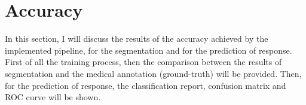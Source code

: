 \documentclass{standalone}
\begin{document}
\section{Accuracy}
In this section, I will discuss the results of the accuracy achieved by the implemented pipeline, for the segmentation and for the prediction of response.\\
First of all the training process, then the comparison between the results of segmentation and the medical annotation (ground-truth) will be provided. 
Then, for the prediction of response, the classification report, confusion matrix and ROC curve will be shown.
\end{document}
